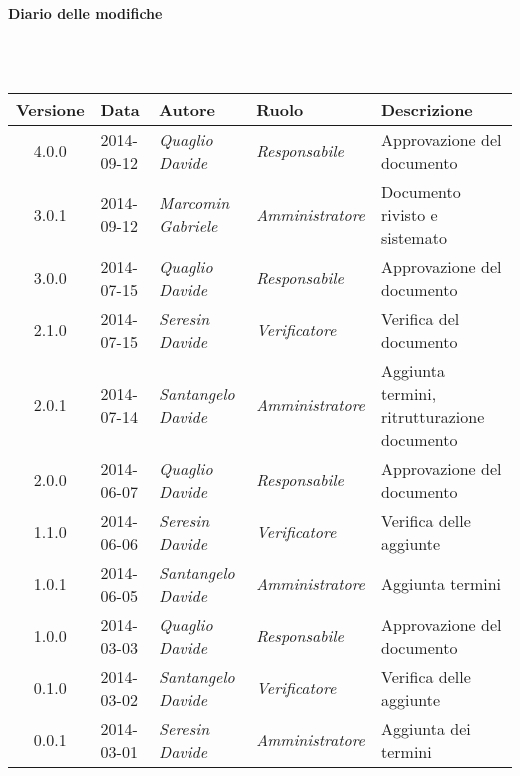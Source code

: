 \noindent\begin{Large}\textbf{Diario delle modifiche}\end{Large}\\
\\
\begin{small}
\begin{tabular}{|c|p{1.8cm}|p{2.8cm}|p{2.8cm}|p{3.5cm}|}
\hline
Versione & Data & Autore & Ruolo & Descrizione \\
\hline
4.0.0 & 2014-09-12 & 
\textit{Quaglio Davide} &
\textit{Responsabile} &  Approvazione del documento\\
\hline
\hline
3.0.1 & 2014-09-12 & 
\textit{Marcomin Gabriele} &
\textit{Amministratore} &  Documento rivisto e sistemato\\
\hline
\hline
3.0.0 & 2014-07-15 & 
\textit{Quaglio Davide} &
\textit{Responsabile} &  Approvazione del documento\\
\hline
\hline
2.1.0 & 2014-07-15 & 
\textit{Seresin Davide} &
\textit{Verificatore} &  Verifica del documento\\
\hline
\hline
2.0.1 & 2014-07-14 & 
\textit{Santangelo Davide} &
\textit{Amministratore} &  Aggiunta termini, ritrutturazione documento\\
\hline
\hline
2.0.0 & 2014-06-07 & 
\textit{Quaglio Davide} &
\textit{Responsabile} &  Approvazione del documento\\
\hline
\hline
1.1.0 & 2014-06-06 & 
\textit{Seresin Davide} &
\textit{Verificatore} &  Verifica delle aggiunte\\
\hline
\hline
1.0.1 & 2014-06-05 & 
\textit{Santangelo Davide} &
\textit{Amministratore} &  Aggiunta termini\\
\hline
\hline
1.0.0 & 2014-03-03 & 
\textit{Quaglio Davide} &
\textit{Responsabile} &  Approvazione del documento\\
\hline
0.1.0 & 2014-03-02 & 
\textit{Santangelo Davide} &
\textit{Verificatore} &  Verifica delle aggiunte\\
\hline
0.0.1 & 2014-03-01 & 
\textit{Seresin Davide} &
\textit{Amministratore} &  Aggiunta dei termini\\
\hline
\end{tabular}\\
\end{small}